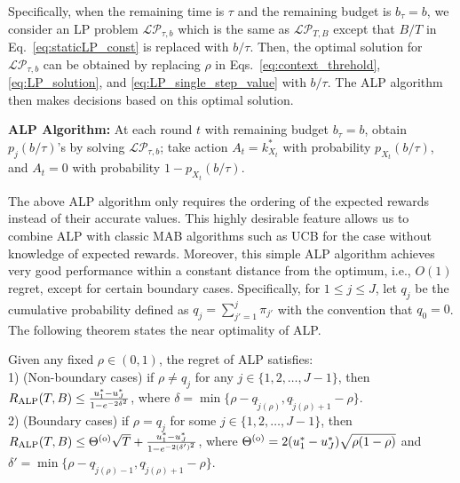 Specifically, when the remaining time is $\tau$ and the remaining budget is $b_\tau = b$, we consider
an LP problem $\mathcal{LP}_{\tau, b}$ which is the same as $\mathcal{LP}_{T,B}$ except that
$B/T$ in Eq.~\eqref{eq:staticLP_const} is replaced with $b/\tau$.
Then, the optimal solution for $\mathcal{LP}_{\tau,b}$ can be obtained by replacing $\rho$ in Eqs.~\eqref{eq:context_threhold},
 \eqref{eq:LP_solution}, and \eqref{eq:LP_single_step_value} with $b/\tau$. The ALP algorithm then makes decisions based on this optimal solution.


\textbf{ALP Algorithm:} At each round $t$ with remaining budget $b_{\tau} = b$, obtain $p_j(b/\tau)$'s by solving $\mathcal{LP}_{\tau, b}$; take action $A_t = k^*_{X_t}$ with probability $p_{X_t}(b/\tau)$, and $A_t = 0$ with probability $1 - p_{X_t}(b/\tau)$.

The above ALP algorithm only requires the ordering of the expected rewards instead of their accurate values. This highly desirable feature allows us to combine ALP with classic MAB algorithms such as UCB \cite{Auer2002ML:UCB} for the case without knowledge of expected rewards. Moreover, this simple ALP algorithm achieves very good performance within a constant distance from the optimum, i.e., $O(1)$ regret, except for certain boundary cases. Specifically, for $1 \leq j \leq J$, let $q_j$ be the cumulative probability defined as
$q_j = \sum_{j'=1}^j \pi_{j'}$ with the convention that $q_{0} = 0$.
The following theorem states  the near optimality of ALP.
\begin{theorem} \label{thm:alp_regret}
Given any fixed $\rho \in (0,1)$, the regret of ALP satisfies:\\
1) (Non-boundary cases) if $\rho \neq q_j$ for any $j \in \{ 1,2,\ldots, J-1\}$, then $R_{\rm ALP}(T,B) \leq \frac{u_1^* - u_J^*}{1 - e^{-2\delta^2}}$,
where $\delta = \min\{\rho - q_{\tilde{j}(\rho)},
q_{\tilde{j}(\rho)+1} -\rho\}$.\\
2) (Boundary cases) if $\rho = q_j$ for some $j \in \{1,2,\ldots, J-1\}$, then $R_{\rm ALP}(T,B) \leq \Theta^{\rm (o)} \sqrt{T} + \frac{u_1^* - u_J^*}{1 - e^{-2(\delta')^2}}$, where $\Theta^{\rm (o)} =  2(u_1^* - u_J^*) \sqrt{\rho (1-\rho)}$ and $\delta' = \min\{\rho - q_{\tilde{j}(\rho) - 1}, q_{\tilde{j}(\rho) +1} - \rho\}$.
\end{theorem}

